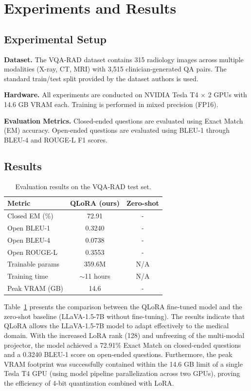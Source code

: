 \section{Experiments and Results}
\label{sec:experiments}

\subsection{Experimental Setup}

\textbf{Dataset.} The VQA-RAD dataset \cite{lau2018dataset} contains 315 radiology images across multiple modalities (X-ray, CT, MRI) with 3,515 clinician-generated QA pairs. The standard train/test split provided by the dataset authors is used.

\textbf{Hardware.} All experiments are conducted on NVIDIA Tesla T4 $\times$ 2 GPUs with 14.6 GB VRAM each. Training is performed in mixed precision (FP16).

\textbf{Evaluation Metrics.} Closed-ended questions are evaluated using Exact Match (EM) accuracy. Open-ended questions are evaluated using BLEU-1 through BLEU-4 and ROUGE-L F1 scores.

\subsection{Results}

\begin{table}[htbp]
\caption{Evaluation results on the VQA-RAD test set.}
\label{tab:results}
\centering
\begin{tabular}{lcc}
\toprule
\textbf{Metric} & \textbf{QLoRA (ours)} & \textbf{Zero-shot} \\
\midrule
Closed EM (\%)       & 72.91 & - \\
Open BLEU-1          & 0.3240 & - \\
Open BLEU-4          & 0.0738 & - \\
Open ROUGE-L         & 0.3553 & - \\
\midrule
Trainable params     & 359.6M & N/A \\
Training time        & $\sim$11 hours & N/A \\
Peak VRAM (GB)       & 14.6 & - \\
\bottomrule
\end{tabular}
\end{table}

Table~\ref{tab:results} presents the comparison between the QLoRA fine-tuned model and the zero-shot baseline (LLaVA-1.5-7B without fine-tuning). The results indicate that QLoRA allows the LLaVA-1.5-7B model to adapt effectively to the medical domain. With the increased LoRA rank (128) and unfreezing of the multi-modal projector, the model achieved a 72.91\% Exact Match on closed-ended questions and a 0.3240 BLEU-1 score on open-ended questions. Furthermore, the peak VRAM footprint was successfully contained within the 14.6 GB limit of a single Tesla T4 GPU (using model pipeline parallelization across two GPUs), proving the efficiency of 4-bit quantization combined with LoRA.

